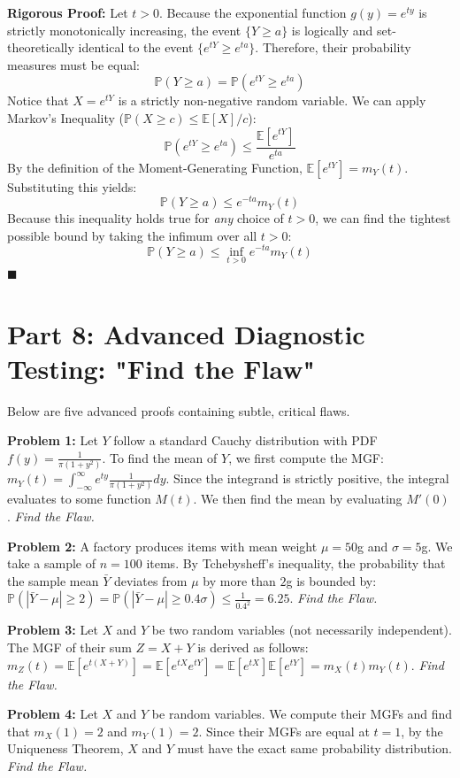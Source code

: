 \documentclass[11pt, a4paper]{article}
\theoremstyle{definition}
\theoremstyle{remark}
\newcommand{\E}{\mathbb{E}}
\newcommand{\Prob}{\mathbb{P}}
\begin{document}
\textbf{Rigorous Proof:}
Let $t > 0$. Because the exponential function $g(y) = e^{ty}$ is strictly monotonically increasing, the event $\{Y \ge a\}$ is logically and set-theoretically identical to the event $\{e^{tY} \ge e^{ta}\}$. Therefore, their probability measures must be equal:
\[ \Prob(Y \ge a) = \Prob(e^{tY} \ge e^{ta}) \]
Notice that $X = e^{tY}$ is a strictly non-negative random variable. We can apply Markov's Inequality ($\Prob(X \ge c) \le \E[X]/c$):
\[ \Prob(e^{tY} \ge e^{ta}) \le \frac{\E[e^{tY}]}{e^{ta}} \]
By the definition of the Moment-Generating Function, $\E[e^{tY}] = m_Y(t)$. Substituting this yields:
\[ \Prob(Y \ge a) \le e^{-ta} m_Y(t) \]
Because this inequality holds true for \textit{any} choice of $t > 0$, we can find the tightest possible bound by taking the infimum over all $t > 0$:
\[ \Prob(Y \ge a) \le \inf_{t > 0} e^{-ta} m_Y(t) \]
$\blacksquare$

\section{Part 8: Advanced Diagnostic Testing: "Find the Flaw"}

Below are five advanced proofs containing subtle, critical flaws. 

\textbf{Problem 1:} Let $Y$ follow a standard Cauchy distribution with PDF $f(y) = \frac{1}{\pi(1+y^2)}$. To find the mean of $Y$, we first compute the MGF: $m_Y(t) = \int_{-\infty}^{\infty} e^{ty} \frac{1}{\pi(1+y^2)} dy$. Since the integrand is strictly positive, the integral evaluates to some function $M(t)$. We then find the mean by evaluating $M'(0)$.
\textit{Find the Flaw.}

\textbf{Problem 2:} A factory produces items with mean weight $\mu = 50$g and $\sigma = 5$g. We take a sample of $n=100$ items. By Tchebysheff's inequality, the probability that the sample mean $\bar{Y}$ deviates from $\mu$ by more than $2$g is bounded by: $\Prob(|\bar{Y} - \mu| \ge 2) = \Prob(|\bar{Y} - \mu| \ge 0.4\sigma) \le \frac{1}{0.4^2} = 6.25$.
\textit{Find the Flaw.}

\textbf{Problem 3:} Let $X$ and $Y$ be two random variables (not necessarily independent). The MGF of their sum $Z = X+Y$ is derived as follows: $m_Z(t) = \E[e^{t(X+Y)}] = \E[e^{tX} e^{tY}] = \E[e^{tX}] \E[e^{tY}] = m_X(t) m_Y(t)$.
\textit{Find the Flaw.}

\textbf{Problem 4:} Let $X$ and $Y$ be random variables. We compute their MGFs and find that $m_X(1) = 2$ and $m_Y(1) = 2$. Since their MGFs are equal at $t=1$, by the Uniqueness Theorem, $X$ and $Y$ must have the exact same probability distribution.
\textit{Find the Flaw.}
\end{document}
